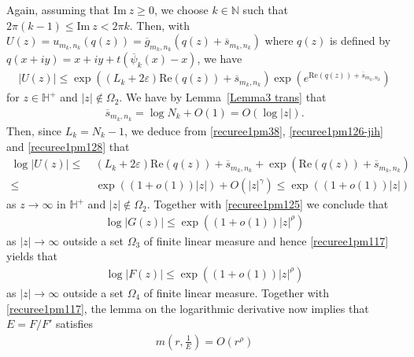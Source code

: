 \documentclass[12pt]{amsart}
\numberwithin{equation}{section}
\begin{document}
Again, assuming that $\text{Im}\ z\geq 0$, we choose $k\in \mathbb{N}$ such that $2\pi (k-1)\leq \text{Im}\ z <2\pi k$. Then, with $U(z)=u_{m_k,n_k}(q(z))=\overline{g}_{m_k,n_k}(q(z)+\overline{s}_{m_k,n_k})$ where $q(z)$ is defined by $q(x+iy)=x+iy+t(\overline{\psi}_k(x)-x)$, we have
\begin{equation}\label{recuree1pm126-jih}
\begin{split}
|U(z)|\leq \exp((L_k+2\varepsilon)\text{Re}(q(z))+\overline{s}_{m_k,n_k})\exp\left(e^{\text{Re}(q(z))+\overline{s}_{m_k,n_k}}\right)
\end{split}
\end{equation}
for $z\in \mathbb{H}^{+}$ and $|z|\not\in \Omega_2$. We have by Lemma~\ref{Lemma3 trans} that
\begin{equation}\label{recuree1pm128}
\begin{split}
\overline{s}_{m_k,n_k}=\log N_k+O(1)=O(\log |z|).
\end{split}
\end{equation}
Then, since $L_k=N_k-1$, we deduce from \eqref{recuree1pm38}, \eqref{recuree1pm126-jih} and \eqref{recuree1pm128} that
\begin{equation*}
\begin{split}
\log|U(z)| \leq&\ (L_k+2\varepsilon)\text{Re}(q(z))+\overline{s}_{m_k,n_k}+\exp(\text{Re}(q(z))+\overline{s}_{m_k,n_k})\\
\leq&\ \exp((1+o(1))|z|)+O(|z|^{\gamma})\leq \exp((1+o(1))|z|)
\end{split}
\end{equation*}
as $z\to\infty$ in $\mathbb{H}^{+}$ and $|z|\not\in \Omega_2$. Together with \eqref{recuree1pm125} we conclude that
\begin{equation*}
\begin{split}
\log|G(z)|\leq \exp((1+o(1))|z|^{\rho})
\end{split}
\end{equation*}
as $|z|\to\infty$ outside a set $\Omega_3$ of finite linear measure and hence \eqref{recuree1pm117} yields that
\begin{equation*}
\begin{split}
\log|F(z)|\leq \exp((1+o(1))|z|^{\rho})
\end{split}
\end{equation*}
as $|z|\to\infty$ outside a set $\Omega_4$ of finite linear measure. Together with \eqref{recuree1pm117}, the lemma on the logarithmic derivative now implies that $E=F/F'$ satisfies
\begin{equation*}
\begin{split}
m\left(r,\frac{1}{E}\right)=O(r^{\rho})
\end{split}
\end{equation*}
\end{document}
